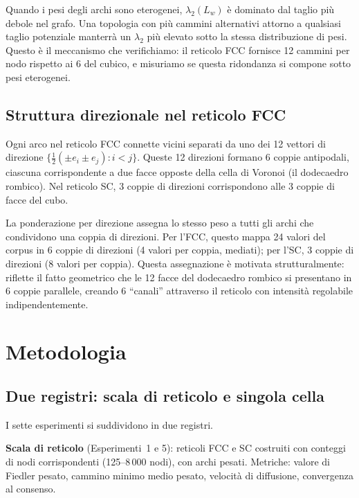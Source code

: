 \documentclass[11pt]{article}
\begin{document}
Quando i pesi degli archi sono eterogenei, $\lambda_2(L_w)$ \`e
dominato dal taglio pi\`u debole nel grafo. Una topologia con pi\`u
cammini alternativi attorno a qualsiasi taglio potenziale manterr\`a un
$\lambda_2$ pi\`u elevato sotto la stessa distribuzione di pesi.
Questo \`e il meccanismo che verifichiamo: il reticolo FCC fornisce 12
cammini per nodo rispetto ai 6 del cubico, e misuriamo se questa
ridondanza si compone sotto pesi eterogenei.

\subsection{Struttura direzionale nel reticolo FCC}

Ogni arco nel reticolo FCC connette vicini separati da uno dei 12
vettori di direzione
$\{\frac{1}{2}(\pm e_i \pm e_j) : i < j\}$. Queste 12 direzioni
formano 6 coppie antipodali, ciascuna corrispondente a due facce
opposte della cella di Voronoi (il dodecaedro rombico). Nel reticolo
SC, 3 coppie di direzioni corrispondono alle 3 coppie di facce del
cubo.

La ponderazione per direzione assegna lo stesso peso a tutti gli archi
che condividono una coppia di direzioni. Per l'FCC, questo mappa 24
valori del corpus in 6 coppie di direzioni (4 valori per coppia,
mediati); per l'SC, 3 coppie di direzioni (8 valori per coppia).
Questa assegnazione \`e motivata strutturalmente: riflette il fatto
geometrico che le 12 facce del dodecaedro rombico si presentano in 6
coppie parallele, creando 6 ``canali'' attraverso il reticolo con
intensit\`a regolabile indipendentemente.

\section{Metodologia}
\label{sec:method}

\subsection{Due registri: scala di reticolo e singola cella}

I sette esperimenti si suddividono in due registri.

\textbf{Scala di reticolo} (Esperimenti~1 e 5): reticoli FCC e SC
costruiti con conteggi di nodi corrispondenti (125--8\,000 nodi), con
archi pesati. Metriche: valore di Fiedler pesato, cammino minimo medio
pesato, velocit\`a di diffusione, convergenza al consenso.
\end{document}

